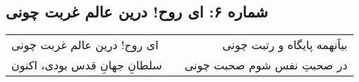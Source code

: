 \begin{center}
\section*{شماره ۶: ای روح! درین عالم غربت چونی}
\label{sec:006}
\begin{longtable}{l p{0.5cm} r}
ای روح! درین عالم غربت چونی
&&
بیآنهمه پایگاه و رتبت چونی
\\
سلطانِ جهانِ قدس بودی، اکنون
&&
در صحبتِ نفس شوم صحبت چونی
\\
\end{longtable}
\end{center}
